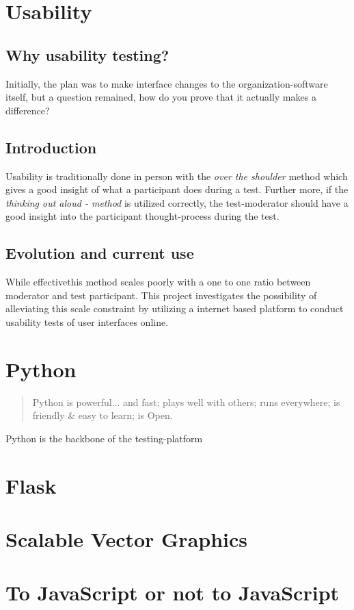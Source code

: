 \section{Usability}

  \subsection{Why usability testing?}

    Initially, the plan was to make interface changes to the
    organization-software itself, but a question remained, how do you prove
    that it actually makes a difference?


  \subsection{Introduction}

    Usability is traditionally done in person with the \textit{over the
    shoulder} method which gives a good insight of what a participant does
    during a test. Further more, if the \textit{thinking out aloud -
    method} is utilized correctly, the test-moderator should have a good
    insight into the participant thought-process during the test.

  \subsection{Evolution and current use}

    While effective\checkTruth this method scales poorly with a one to one
    ratio between moderator and test participant. This project investigates
    the possibility of alleviating this scale constraint by utilizing a
    internet based platform to conduct usability tests of user interfaces
    online.



\section{Python}

  \begin{quote}
    Python is powerful... and fast; plays well with others; runs everywhere; is
    friendly \& easy to learn; is Open.
  \end{quote}

  Python is the backbone of the testing-platform

  \cite{citeIeeeSpectrum}

  \cite{citepypl}

  \cite{citetiobe}

\section{Flask}

\section{Scalable Vector Graphics}

\section{To JavaScript or not to JavaScript}
